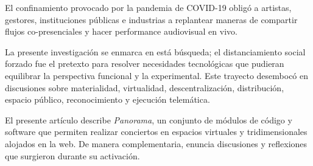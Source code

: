 
El confinamiento provocado por la pandemia de COVID-19 obligó a artistas, gestores, instituciones públicas e industrias a replantear maneras de compartir flujos co-presenciales y hacer performance audiovisual en vivo.

La presente investigación se enmarca en está búsqueda; el distanciamiento social forzado fue el pretexto para resolver necesidades tecnológicas que pudieran equilibrar la perspectiva funcional y la experimental. Este trayecto desembocó en discusiones sobre materialidad, virtualidad, descentralización, distribución, espacio público, reconocimiento y ejecución telemática.                            

El presente artículo describe \textit{Panorama}, un conjunto de módulos de código y software que permiten realizar conciertos en espacios virtuales y tridimensionales alojados en la web. De manera complementaria, enuncia discusiones y reflexiones que surgieron durante su activación. 
